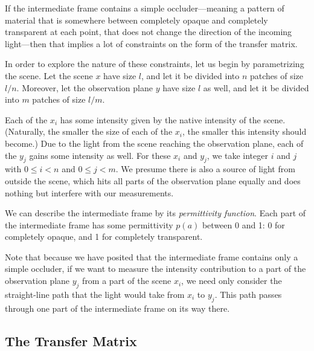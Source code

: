 \documentclass[11pt]{article}
\begin{document}
If the intermediate frame contains a simple occluder---meaning a pattern of material that is somewhere between completely opaque and completely transparent at each point, that does not change the direction of the incoming light---then that implies a lot of constraints on the form of the transfer matrix.

In order to explore the nature of these constraints, let us begin by parametrizing the scene. Let the scene $x$ have size $l$, and let it be divided into $n$ patches of size $l/n$. Moreover, let the observation plane $y$ have size $l$ as well, and let it be divided into $m$ patches of size $l/m$. 

Each of the $x_i$ has some intensity given by the native intensity of the scene. (Naturally, the smaller the size of each of the $x_i$, the smaller this intensity should become.) Due to the light from the scene reaching the observation plane, each of the $y_j$ gains some intensity as well. For these $x_i$ and $y_j$, we take integer $i$ and $j$ with $0 \le i < n$ and $0 \le j < m$. We presume there is also a source of light from outside the scene, which hits all parts of the observation plane equally and does nothing but interfere with our measurements.

We can describe the intermediate frame by its \emph{permittivity function}. Each part of the intermediate frame has some permittivity $p(a)$ between 0 and 1: 0 for completely opaque, and 1 for completely transparent. %


Note that because we have posited that the intermediate frame contains only a simple occluder, if we want to measure the intensity contribution to a part of the observation plane $y_j$ from a part of the scene $x_i$, we need only consider the straight-line path that the light would take from $x_i$ to $y_j$. This path passes through one part of the intermediate frame on its way there.

\subsection{The Transfer Matrix}
\end{document}
